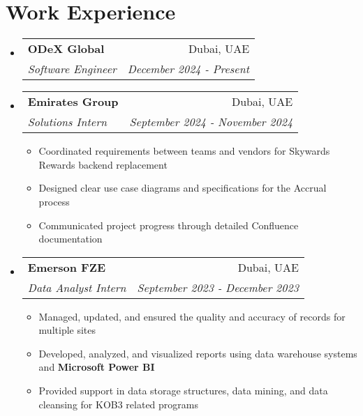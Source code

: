 \documentclass[a4paper,20pt]{article}
\makeatletter
\newcommand{\resumeItemWithoutTitle}[1] {
	\item\small{
		{#1 \vspace{-2pt}}
	}
}
\newcommand{\resumeSubheading}[4] {
	\vspace{-1pt}\item
	\begin{tabular*}{0.97\textwidth}{l@{\extracolsep{\fill}}r}
		\textbf{#1} & #2 \\
		\textit{#3} & \textit{#4} \\
	\end{tabular*}\vspace{-5pt}
}
\newcommand{\resumeSubHeadingListStart}{\begin{itemize}[leftmargin=*]}
\newcommand{\resumeSubHeadingListEnd}{\end{itemize}}
\newcommand{\resumeItemListStart}{\begin{itemize}}
\newcommand{\resumeItemListEnd}{\end{itemize}\vspace{-5pt}}
\makeatother
\begin{document}

\vspace{2pt}

\section{Work Experience}
	\resumeSubHeadingListStart
		\resumeSubheading{ODeX Global}{Dubai, UAE} {Software Engineer}{December 2024 - Present}
		\vspace{5pt}
		\resumeSubheading{Emirates Group}{Dubai, UAE} {Solutions Intern}{September 2024 - November 2024}
		\resumeItemListStart
			\resumeItemWithoutTitle{Coordinated requirements between teams and vendors for Skywards Rewards backend replacement}
			\resumeItemWithoutTitle{Designed clear use case diagrams and specifications for the Accrual process}
			\resumeItemWithoutTitle{Communicated project progress through detailed Confluence documentation}
		\resumeItemListEnd
		\vspace{5pt}
		\resumeSubheading{Emerson FZE}{Dubai, UAE} {Data Analyst Intern}{September 2023 - December 2023}
		\resumeItemListStart
			\resumeItemWithoutTitle{Managed, updated, and ensured the quality and accuracy of records for multiple sites}
			\resumeItemWithoutTitle{Developed, analyzed, and visualized reports using data warehouse systems and \textbf{Microsoft Power BI}}
			\resumeItemWithoutTitle{Provided support in data storage structures, data mining, and data cleansing for KOB3 related programs}
		\resumeItemListEnd
		\vspace{5pt}
	\resumeSubHeadingListEnd
\vspace{-2pt}

\end{document}
